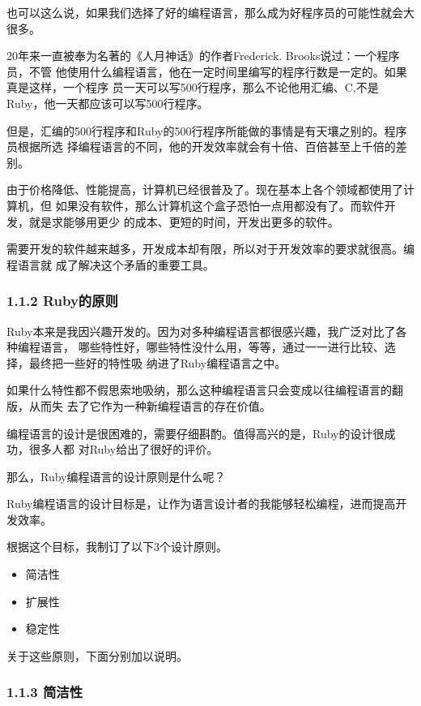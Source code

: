 \documentclass[11pt]{ctexart}
\begin{document}
也可以这么说，如果我们选择了好的编程语言，那么成为好程序员的可能性就会大很多。

20年来一直被奉为名著的《人月神话》的作者Frederick. Brooks说过：一个程序员，不管
他使用什么编程语言，他在一定时间里编写的程序行数是一定的。如果真是这样，一个程序
员一天可以写500行程序，那么不论他用汇编、C,不是Ruby，他一天都应该可以写500行程序。

但是，汇编的500行程序和Ruby的500行程序所能做的事情是有天壤之别的。程序员根据所选
择编程语言的不同，他的开发效率就会有十倍、百倍甚至上千倍的差别。

由于价格降低、性能提高，计算机已经很普及了。现在基本上各个领域都使用了计算机，但
如果没有软件，那么计算机这个盒子恐怕一点用都没有了。而软件开发，就是求能够用更少
的成本、更短的时间，开发出更多的软件。

需要开发的软件越来越多，开发成本却有限，所以对于开发效率的要求就很高。编程语言就
成了解决这个矛盾的重要工具。

\subsubsection{1.1.2 Ruby的原则}
\label{sec:orgheadline2}

Ruby本来是我因兴趣开发的。因为对多种编程语言都很感兴趣，我广泛对比了各种编程语言，
哪些特性好，哪些特性没什么用，等等，通过一一进行比较、选择，最终把一些好的特性吸
纳进了Ruby编程语言之中。

如果什么特性都不假思索地吸纳，那么这种编程语言只会变成以往编程语言的翻版，从而失
去了它作为一种新编程语言的存在价值。

编程语言的设计是很困难的，需要仔细斟酌。值得高兴的是，Ruby的设计很成功，很多人都
对Ruby给出了很好的评价。

那么，Ruby编程语言的设计原则是什么呢？

Ruby编程语言的设计目标是，让作为语言设计者的我能够轻松编程，进而提高开发效率。

根据这个目标，我制订了以下3个设计原则。

\begin{itemize}
\item 简洁性
\item 扩展性
\item 稳定性
\end{itemize}

关于这些原则，下面分别加以说明。

\subsubsection{1.1.3 简洁性}
\label{sec:orgheadline3}
\end{document}
